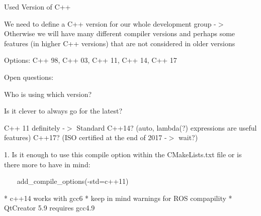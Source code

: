 \begin{DoxyEnumerate}
\item Used Version of C++
\begin{DoxyEnumerate}
\item We need to define a C++ version for our whole development group -\/$>$ Otherwise we will have many different compiler versions and perhaps some features (in higher C++ versions) that are not considered in older versions
\begin{DoxyEnumerate}
\item Options\+: C++ 98, C++ 03, C++ 11, C++ 14, C++ 17
\end{DoxyEnumerate}
\begin{DoxyEnumerate}
\item Open questions\+:
\begin{DoxyItemize}
\item Who is using which version?
\item Is it clever to always go for the latest?

C++ 11 definitely -\/$>$ Standard C++14? (auto, lambda(?) expressions are useful features) C++17? (I\+SO certified at the end of 2017 -\/$>$ wait?)
\end{DoxyItemize}
\end{DoxyEnumerate}
\end{DoxyEnumerate}
\end{DoxyEnumerate}

\begin{DoxyVerb}1. Is it enough to use this compile option within the CMakeLists.txt file or is there more to have in mind:

    ~~~
    add_compile_options(-std=c++11)
    ~~~

    * c++14 works with gcc6 
    * keep in mind warnings for ROS compapility
    * QtCreator 5.9 requires gcc4.9
\end{DoxyVerb}



